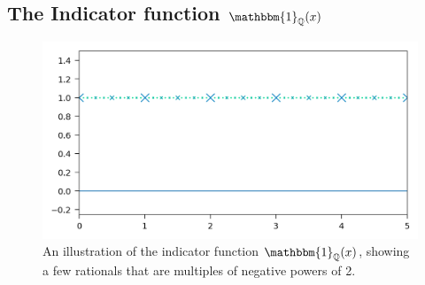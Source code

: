 \subsection{The Indicator function $\mathbbm{1}_\Q(x)$}
\begin{figure}[ht]
	\centering
	\includegraphics{Code/Rational.png}
	\caption{An illustration of the indicator function $\mathbbm{1}_\Q(x)$, showing a few rationals that are multiples of negative powers of 2.}
	\label{fig:rational}
\end{figure}